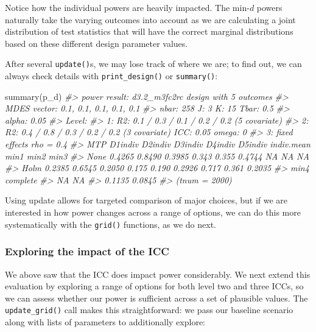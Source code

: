 \documentclass[
]{article}
\newenvironment{Shaded}{\begin{snugshade}}{\end{snugshade}}
\newcommand{\CommentTok}[1]{\textcolor[rgb]{0.56,0.35,0.01}{\textit{#1}}}
\newcommand{\FunctionTok}[1]{\textcolor[rgb]{0.00,0.00,0.00}{#1}}
\newcommand{\NormalTok}[1]{#1}
\begin{document}
Notice how the individual powers are heavily impacted. The min-\(d\)
powers naturally take the varying outcomes into account as we are
calculating a joint distribution of test statistics that will have the
correct marginal distributions based on these different design parameter
values.

After several \texttt{update()}s, we may lose track of where we are; to
find out, we can always check details with \texttt{print\_design()} or
\texttt{summary()}:

\begin{Shaded}
\begin{Highlighting}[]
\FunctionTok{summary}\NormalTok{(p\_d)}
\CommentTok{\#\textgreater{} power result: d3.2\_m3fc2rc design with 5 outcomes}
\CommentTok{\#\textgreater{}   MDES vector: 0.1, 0.1, 0.1, 0.1, 0.1}
\CommentTok{\#\textgreater{}   nbar: 258  J: 3    K: 15   Tbar: 0.5}
\CommentTok{\#\textgreater{}   alpha: 0.05    }
\CommentTok{\#\textgreater{}   Level:}
\CommentTok{\#\textgreater{}     1: R2: 0.1 / 0.3 / 0.1 / 0.2 / 0.2 (5 covariate)}
\CommentTok{\#\textgreater{}     2: R2: 0.4 / 0.8 / 0.3 / 0.2 / 0.2 (3 covariate) ICC: 0.05   omega: 0}
\CommentTok{\#\textgreater{}     3:   fixed effects    rho = 0.4}
\CommentTok{\#\textgreater{}   MTP D1indiv D2indiv D3indiv D4indiv D5indiv indiv.mean  min1  min2   min3}
\CommentTok{\#\textgreater{}  None  0.4265  0.8490  0.3985   0.343   0.355     0.4744    NA    NA     NA}
\CommentTok{\#\textgreater{}  Holm  0.2385  0.6545  0.2050   0.175   0.190     0.2926 0.717 0.361 0.2035}
\CommentTok{\#\textgreater{}    min4 complete}
\CommentTok{\#\textgreater{}      NA       NA}
\CommentTok{\#\textgreater{}  0.1135   0.0845}
\CommentTok{\#\textgreater{}  (tnum = 2000)}
\end{Highlighting}
\end{Shaded}

Using update allows for targeted comparison of major choices, but if we
are interested in how power changes across a range of options, we can do
this more systematically with the \texttt{grid()} functions, as we do
next.

\subsubsection{Exploring the impact of the ICC}

We above saw that the ICC does impact power considerably. We next extend
this evaluation by exploring a range of options for both level two and
three ICCs, so we can assess whether our power is sufficient across a
set of plausible values. The \texttt{update\_grid()} call makes this
straightforward: we pass our baseline scenario along with lists of
parameters to additionally explore:
\end{document}
